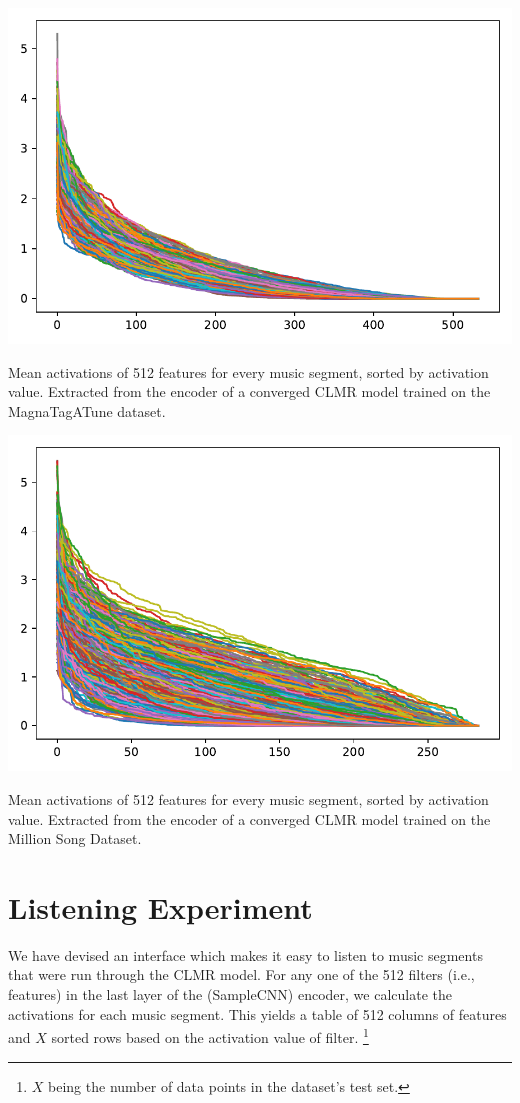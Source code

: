 \begin{marginfigure}
    \includegraphics[width=\textwidth]{figs/activations.pdf}
    \caption{Mean activations of 512 features for every music segment, sorted by activation value. Extracted from the encoder of a converged CLMR model trained on the MagnaTagATune dataset.}
    \label{fig:magnatagatune_activations}
\end{marginfigure}

\begin{marginfigure}
    \includegraphics[width=\textwidth]{figs/activations_msd.pdf}
    \caption{Mean activations of 512 features for every music segment, sorted by activation value. Extracted from the encoder of a converged CLMR model trained on the Million Song Dataset.}
    \label{fig:msd_activations}
\end{marginfigure}

\section{Listening Experiment}
We have devised an interface which makes it easy to listen to music segments that were run through the CLMR model.
For any one of the 512 filters (i.e., features) in the last layer of the (SampleCNN) encoder, we calculate the activations for each music segment.
This yields a table of 512 columns of features and $X$ sorted rows based on the activation value of filter.
\footnote{$X$ being the number of data points in the dataset's test set.}

